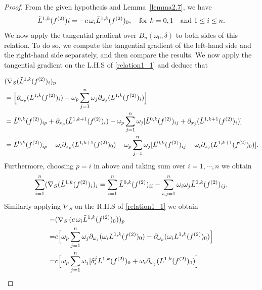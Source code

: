 \documentclass[11pt,a4paper,reqno]{amsart}
\newcommand{\qum}[1]{\quad\mbox{#1}}
\begin{document}
	\begin{proof}
		From the given hypothesis and Lemma~\ref{lemma2.7}, we have
		\begin{equation}\label{relation1_1}
			\Tilde{L}^{1,k}(f^{(2)})i = -c\,\omega_{i}\Tilde{L}^{1,k}(f^{(2)})_{0},
			\quad \text{for $k=0,1$} \qum{and $1\le i\le n$}.
		\end{equation}
		We now apply the tangential gradient over $B_{n}(\omega_0,\delta)$ to both sides of this relation. To do so, we compute the tangential gradient of the left-hand side and the right-hand side separately, and then compare the results.
We now apply the tangential gradient on the L.H.S of \eqref{relation1_1} and deduce that

\begin{equation*}
\begin{aligned}
&	(	\nabla_{S}(\Tilde{L}^{1,k}(f^{(2)})_{i})_p\\&=\Big[\partial_{\omega_p}(L^{1,k}(f^{(2)})_{i})-\omega_{p}\sum_{j=1}^{n}\omega_{j}\partial_{\omega_j}(L^{1,k}(f^{(2)})_{i})\Big]\\
&= \Tilde{L}^{0,k}(f^{(2)})_{ip}+\partial_{x_p}(\Tilde{L}^{1,k+1}(f^{(2)})_{i})-\omega_{p}\sum_{j=1}^{n}\omega_{j}[\Tilde{L}^{0,k}(f^{(2)})_{ij}+\partial_{x_j}(\Tilde{L}^{1,k+1}(f^{(2)})_{i})]\\
&=\Tilde{L}^{0,k}(f^{(2)})_{ip}-\omega_{i}\partial_{x_p}(\Tilde{L}^{1,k+1}(f^{(2)})_0)-
\omega_p \sum_{j=1}^{n}\omega_{j}[\Tilde{L}^{0,k}(f^{(2)})_{ij}-  \omega_{i}\partial_{x_j}(\Tilde{L}^{1,k+1}(f^{(2)})_0)].
\end{aligned}
\end{equation*}
Furthermore, choosing  $p=i$ in above and taking  sum over $i=1,\cdots,n$ we obtain 
\begin{align}\label{eq_3.1}
			\sum_{i=1}^n 	(	\nabla_{S}(\Tilde{L}^{1,k}(f^{(2)})_{i})_i= \sum_{i=1}^{n}\Tilde{L}^{0,k}(f^{(2)})_{ii}-\sum_{i,j=1}^{n}\omega_{i} \omega_{j}\Tilde{L}^{0,k}(f^{(2)})_{ij}.
		\end{align}
		Similarly applying $\nabla_S$ on the R.H.S of \eqref{relation1_1} we obtain 
		\begin{equation*}
			\begin{aligned}
			-& (\nabla_{S}\,(c\,\omega_{i}\Tilde{L}^{1,k}(f^{(2)})_{0}))_p\\	=&c\Big[\omega_p \sum_{j=1}^{n}\omega_{j}\partial_{\omega_j}(\omega_{i}L^{1,k}(f^{(2)})_0)-\partial_{\omega_p}(\omega_i L^{1,k}(f^{(2)})_0)\Big]\\
				=&c\Big[\omega_p \sum_{j=1}^{n}\omega_j [\delta_i^jL^{1,k}(f^{(2)})_0+\omega_i \partial_{\omega_j}(L^{1,k}(f^{(2)})_0)\Big] \\

\end{aligned}
\end{equation*}
\end{proof}
\end{document}
